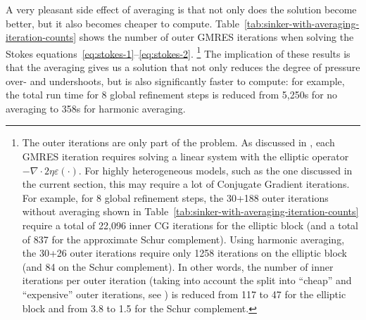\documentclass{article}
\begin{document}
A very pleasant side effect of averaging is that not only does the solution
become better, but it also becomes cheaper to compute.
Table~\ref{tab:sinker-with-averaging-iteration-counts} shows the
number of outer GMRES iterations when solving the Stokes
equations~\eqref{eq:stokes-1}--\eqref{eq:stokes-2}.%
\footnote{The outer iterations are only part of the problem. As discussed in
  \cite{KHB12}, each GMRES iteration requires solving a linear system with the
  elliptic operator $-\nabla \cdot 2 \eta \varepsilon(\cdot)$. For highly
  heterogeneous models, such as the one discussed in the current section, this
  may require a lot of Conjugate Gradient iterations. For example, for 8
  global refinement steps, the 30+188 outer iterations without averaging shown
  in Table~\ref{tab:sinker-with-averaging-iteration-counts} require a total of
  22,096 inner CG iterations for the elliptic block (and a total of 837 for the
  approximate Schur complement). Using harmonic averaging, the 30+26 outer
  iterations require only 1258 iterations on the elliptic block (and 84 on the
  Schur complement). In other words, the number of inner iterations per outer
  iteration (taking into account the split into ``cheap'' and ``expensive''
  outer iterations, see \cite{KHB12}) is reduced from 117 to 47 for the
  elliptic block and from 3.8 to 1.5 for the Schur complement.}
The implication of these results is that the averaging gives us a solution
that not only reduces the degree of pressure over- and undershoots, but is also
significantly faster to compute: for example, the total run time for 8 global
refinement steps is reduced from 5,250s for no averaging to 358s for harmonic
averaging.
\end{document}
